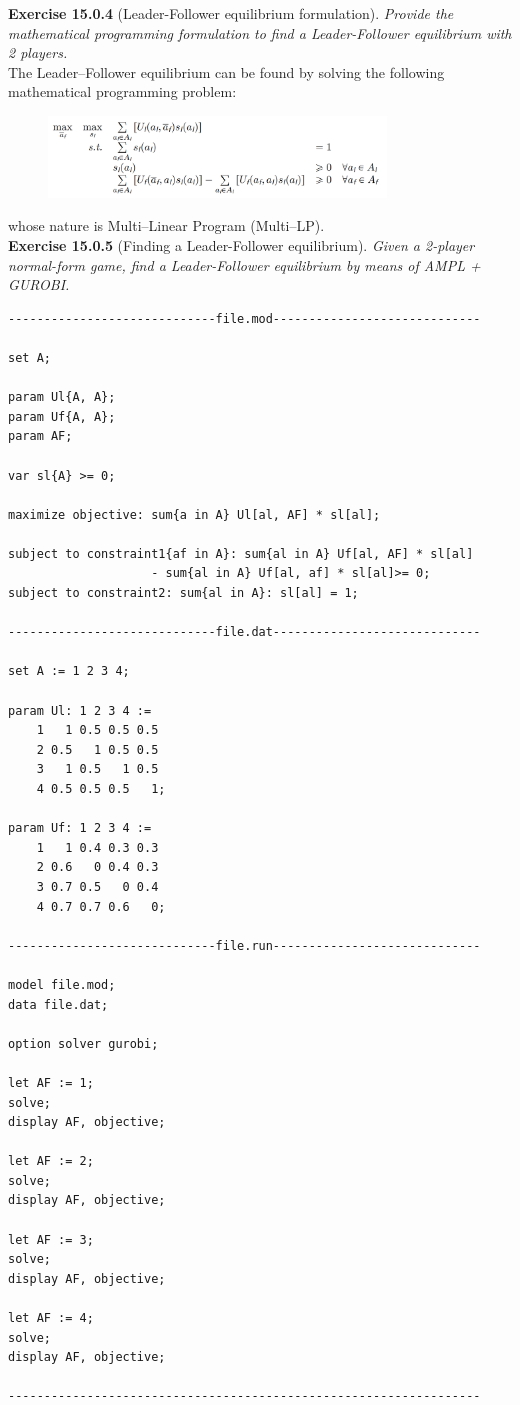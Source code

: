 \textbf{Exercise 15.0.4} (Leader-Follower equilibrium formulation). \textit{Provide the mathematical programming formulation to find a Leader-Follower equilibrium with 2 players.}\\

The Leader–Follower equilibrium can be found by solving the following mathematical programming problem:
\begin{figure}[H]
\centering
\includegraphics[width=0.8\textwidth]{images/img_3_15_04.png}
\end{figure}
whose nature is Multi–Linear Program (Multi–LP).\\

\textbf{Exercise 15.0.5} (Finding a Leader-Follower equilibrium). \textit{Given a 2-player normal-form game, find a Leader-Follower equilibrium by means of AMPL + GUROBI.}\\
\begin{verbatim}
-----------------------------file.mod-----------------------------

set A;

param Ul{A, A};
param Uf{A, A};
param AF;

var sl{A} >= 0;

maximize objective: sum{a in A} Ul[al, AF] * sl[al];

subject to constraint1{af in A}: sum{al in A} Uf[al, AF] * sl[al] 
                    - sum{al in A} Uf[al, af] * sl[al]>= 0;
subject to constraint2: sum{al in A}: sl[al] = 1;

-----------------------------file.dat-----------------------------

set A := 1 2 3 4;

param Ul: 1 2 3 4 :=
	1   1 0.5 0.5 0.5
	2 0.5   1 0.5 0.5
	3   1 0.5   1 0.5
	4 0.5 0.5 0.5   1;

param Uf: 1 2 3 4 :=
	1   1 0.4 0.3 0.3
	2 0.6   0 0.4 0.3
	3 0.7 0.5   0 0.4
	4 0.7 0.7 0.6   0;
	
-----------------------------file.run-----------------------------

model file.mod;
data file.dat;

option solver gurobi;

let AF := 1;
solve;
display AF, objective;

let AF := 2;
solve;
display AF, objective;

let AF := 3;
solve;
display AF, objective;

let AF := 4;
solve;
display AF, objective;

------------------------------------------------------------------
\end{verbatim}

